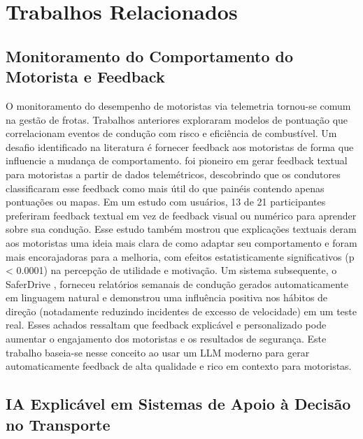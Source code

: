\documentclass[12pt]{article}
\begin{document}
\section{Trabalhos Relacionados}

\subsection{Monitoramento do Comportamento do Motorista e Feedback}

O monitoramento do desempenho de motoristas via telemetria tornou-se comum na gestão de frotas. Trabalhos anteriores exploraram modelos de pontuação que correlacionam eventos de condução com risco e eficiência de combustível. Um desafio identificado na literatura é fornecer feedback aos motoristas de forma que influencie a mudança de comportamento. \cite{braun2015} foi pioneiro em gerar feedback textual para motoristas a partir de dados telemétricos, descobrindo que os condutores classificaram esse feedback como mais útil do que painéis contendo apenas pontuações ou mapas. Em um estudo com usuários, 13 de 21 participantes preferiram feedback textual em vez de feedback visual ou numérico para aprender sobre sua condução. Esse estudo também mostrou que explicações textuais deram aos motoristas uma ideia mais clara de como adaptar seu comportamento e foram mais encorajadoras para a melhoria, com efeitos estatisticamente significativos (p \textless{} 0.0001) na percepção de utilidade e motivação. Um sistema subsequente, o SaferDrive \cite{saferdrive2017}, forneceu relatórios semanais de condução gerados automaticamente em linguagem natural e demonstrou uma influência positiva nos hábitos de direção (notadamente reduzindo incidentes de excesso de velocidade) em um teste real. Esses achados ressaltam que feedback explicável e personalizado pode aumentar o engajamento dos motoristas e os resultados de segurança. Este trabalho baseia-se nesse conceito ao usar um LLM moderno para gerar automaticamente feedback de alta qualidade e rico em contexto para motoristas. 

\subsection{IA Explicável em Sistemas de Apoio à Decisão no Transporte}
\end{document}
